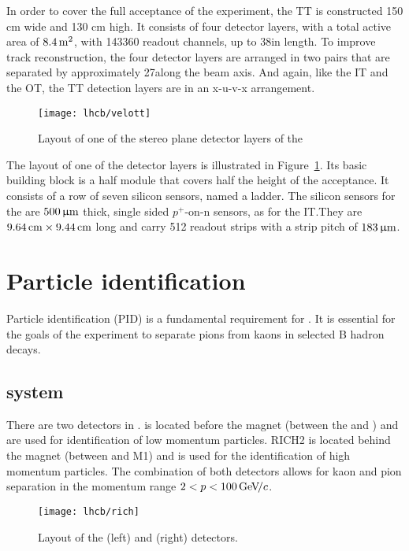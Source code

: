 In order to cover the full acceptance of the experiment, the TT is constructed
150 cm wide and 130 cm high. It consists of four detector layers, with a total
active area of $8.4\rm \,m^2$, with 143360 readout channels, up to 38\cm in length.
To improve track reconstruction, the four detector layers are arranged in two
pairs that are separated by approximately 27\cm along the \lhcb beam axis. And
again, like the IT and the OT, the TT detection layers are in an x-u-v-x
arrangement.

\begin{figure}[tb]
\begin{center}
\texttt{[image: lhcb/velott]}
\end{center}
\caption{\small Layout of one of the stereo plane detector layers of the \ttracker}
\label{fig:velott}
\end{figure}


The layout of one of the detector layers is illustrated in
Figure~\ref{fig:velott}. Its basic building block is a half module that covers
half the height of the \lhcb acceptance. It consists of a row of seven silicon
sensors, named a ladder. The silicon sensors for the \ttracker are $500{\,\upmu\rm m}$
thick, single sided $p^+$-on-n sensors, as for the IT.\@ They are
$9.64\rm \,cm\times9.44\rm \,cm$ long and carry 512 readout strips with a strip pitch of
$183{\,\upmu\rm m}$.

\section{Particle identification}

Particle identiﬁcation (PID) is a fundamental requirement for \lhcb. It is
essential for the goals of the experiment to separate pions from kaons in
selected B hadron decays.

\subsection{\rich system}

There are two \rich detectors in \lhcb. \richone is located before the magnet
(between the \velo and \ttracker) and are used for identification of low momentum
particles. RICH2 is located behind the magnet (between \ot and M1) and is
used for the identification of high momentum particles. The combination of both
detectors allows for kaon and pion separation in the momentum range $2 < p <
100 {\mathrm{\,Ge\kern -0.1em V\!/}c}$.

\begin{figure}[tb]
\centering
\texttt{[image: lhcb/rich]}
\caption{\small Layout of the \richone(left) and \richtwo(right) detectors.}
\label{fig:rich}
\end{figure}

